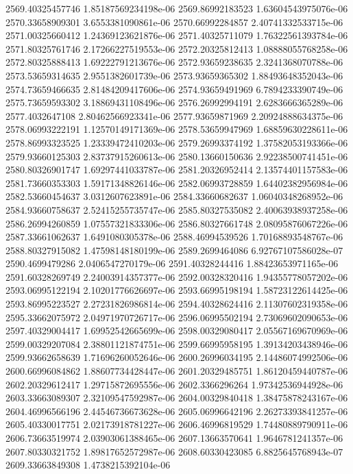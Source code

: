 {2569.40325457746 1.85187569234198e-06
2569.86992183523 1.63604543975076e-06
2570.33658909301 3.6553381090861e-06
2570.66992284857 2.40741332533715e-06
2571.00325660412 1.24369123621876e-06
2571.40325711079 1.76322561393784e-06
2571.80325761746 2.17266227519553e-06
2572.20325812413 1.08888055768258e-06
2572.80325888413 1.69222791213676e-06
2572.93659238635 2.3241368070788e-06
2573.53659314635 2.9551382601739e-06
2573.93659365302 1.88493648352043e-06
2574.73659466635 2.81484209417606e-06
2574.93659491969 6.7894233390749e-06
2575.73659593302 3.18869431108496e-06
2576.26992994191 2.6283666365289e-06
2577.4032647108 2.80462566923341e-06
2577.93659871969 2.20924888634375e-06
2578.06993222191 1.12570149171369e-06
2578.53659947969 1.68859630228611e-06
2578.86993323525 1.23339472410203e-06
2579.26993374192 1.37582053193366e-06
2579.93660125303 2.83737915260613e-06
2580.13660150636 2.92238500741451e-06
2580.80326901747 1.69297441033787e-06
2581.20326952414 2.13574401157583e-06
2581.73660353303 1.59171348826146e-06
2582.06993728859 1.64402382956984e-06
2582.53660454637 3.0312607623891e-06
2584.33660682637 1.06040348268952e-06
2584.93660758637 2.52415255735747e-06
2585.80327535082 2.40063938937258e-06
2586.26994260859 1.07557321833306e-06
2586.80327661748 2.08095876067226e-06
2587.33661062637 1.6491080305378e-06
2588.46994539526 1.70168893548767e-06
2588.80327915082 1.47598148180199e-06
2589.2699464086 6.92767107586028e-07
2590.4699479286 2.0406547270179e-06
2591.40328244416 1.88423653971165e-06
2591.60328269749 2.24003914357377e-06
2592.00328320416 1.94355778057202e-06
2593.06995122194 2.10201776626697e-06
2593.66995198194 1.58723122614425e-06
2593.86995223527 2.27231826986814e-06
2594.40328624416 2.11307602319358e-06
2595.33662075972 2.04971970726717e-06
2596.06995502194 2.73069602090653e-06
2597.40329004417 1.69952542665699e-06
2598.00329080417 2.05567169670969e-06
2599.00329207084 2.38801121874751e-06
2599.66995958195 1.39134203438946e-06
2599.93662658639 1.71696260052646e-06
2600.26996034195 2.14486074992506e-06
2600.66996084862 1.88607734428447e-06
2601.20329485751 1.86120459440787e-06
2602.20329612417 1.29715872695556e-06
2602.3366296264 1.97342536944928e-06
2603.33663089307 2.32109547592987e-06
2604.00329840418 1.38475878243167e-06
2604.46996566196 2.44546736673628e-06
2605.06996642196 2.26273393841257e-06
2605.40330017751 2.02173918781227e-06
2606.46996819529 1.74480889790911e-06
2606.73663519974 2.03903061388465e-06
2607.13663570641 1.9646781241357e-06
2607.80330321752 1.89817652572987e-06
2608.60330423085 6.8825645768943e-07
2609.33663849308 1.4738215392104e-06
}
